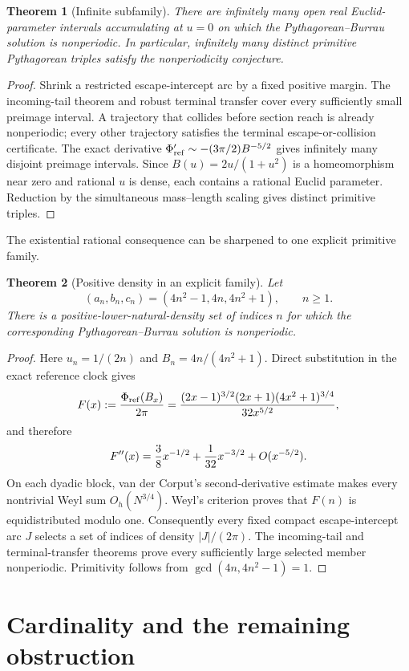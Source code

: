 \documentclass[11pt]{article}
\newtheorem{theorem}{Theorem}
\begin{document}
\begin{theorem}[Infinite subfamily]
There are infinitely many open real Euclid-parameter intervals accumulating
at $u=0$ on which the Pythagorean--Burrau solution is nonperiodic. In
particular, infinitely many distinct primitive Pythagorean triples satisfy the
nonperiodicity conjecture.
\end{theorem}
\begin{proof}
Shrink a restricted escape-intercept arc by a fixed positive margin. The
incoming-tail theorem and robust terminal transfer cover every sufficiently
small preimage interval. A trajectory that collides before section reach is
already nonperiodic; every other trajectory satisfies the terminal
escape-or-collision certificate. The exact derivative
$\Phi_{\rm ref}'\sim-(3\pi/2)B^{-5/2}$ gives infinitely many disjoint
preimage intervals. Since $B(u)=2u/(1+u^2)$ is a homeomorphism near zero and
rational $u$ is dense, each contains a rational Euclid parameter. Reduction
by the simultaneous mass--length scaling gives distinct primitive triples.
\end{proof}

The existential rational consequence can be sharpened to one explicit
primitive family.

\begin{theorem}[Positive density in an explicit family]
Let
\[
(a_n,b_n,c_n)=(4n^2-1,4n,4n^2+1),\qquad n\ge1.
\]
There is a positive-lower-natural-density set of indices $n$ for which the
corresponding Pythagorean--Burrau solution is nonperiodic.
\end{theorem}
\begin{proof}
Here $u_n=1/(2n)$ and $B_n=4n/(4n^2+1)$. Direct substitution in the exact
reference clock gives
\[
F(x):={\Phi_{\rm ref}(B_x)\over2\pi}
={ (2x-1)^{3/2}(2x+1)(4x^2+1)^{3/4}\over32x^{5/2}},
\]
and therefore
\[
F''(x)={3\over8}x^{-1/2}+{1\over32}x^{-3/2}+O(x^{-5/2}).
\]
On each dyadic block, van der Corput's second-derivative estimate makes every
nontrivial Weyl sum $O_h(N^{3/4})$. Weyl's criterion proves that $F(n)$ is
equidistributed modulo one. Consequently every fixed compact escape-intercept
arc $J$ selects a set of indices of density $|J|/(2\pi)$. The incoming-tail
and terminal-transfer theorems prove every sufficiently large selected member
nonperiodic. Primitivity follows from
$\gcd(4n,4n^2-1)=1$.
\end{proof}

\section{Cardinality and the remaining obstruction}
\end{document}
